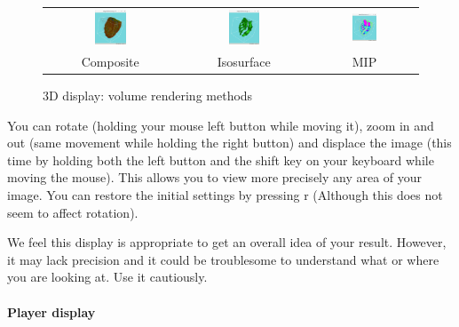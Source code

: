 \documentclass[a4paper,10pt,oneside]{article}
\begin{document}
\begin{figure}
\centering
\begin{tabular}{ccc}
\includegraphics[width=0.25\textwidth]{images/dis3D_volren_compo.png} & 
\includegraphics[width=0.25\textwidth]{images/dis3D_volren_iso.png} &
\includegraphics[width=0.25\textwidth]{images/dis3D_volren_mip.png} \\ 
Composite &
Isosurface &
MIP \\ 
\end{tabular}
\caption{3D display: volume rendering methods}
\label{fig:dis3D_volren_method}
\end{figure}

You can rotate (holding your mouse left button while moving it), zoom in and
out (same movement while holding the right button) and displace the image
(this time by holding both the left button and the shift key on your keyboard
while moving the mouse). This allows you to view more precisely any area of
your image. You can restore the initial settings by pressing r (Although this
does not seem to affect rotation).

We feel this display is appropriate to get an overall idea of your
result. However, it may lack precision and it could be troublesome to
understand what or where you are looking at. Use it cautiously.

\paragraph{Player display}
\end{document}
